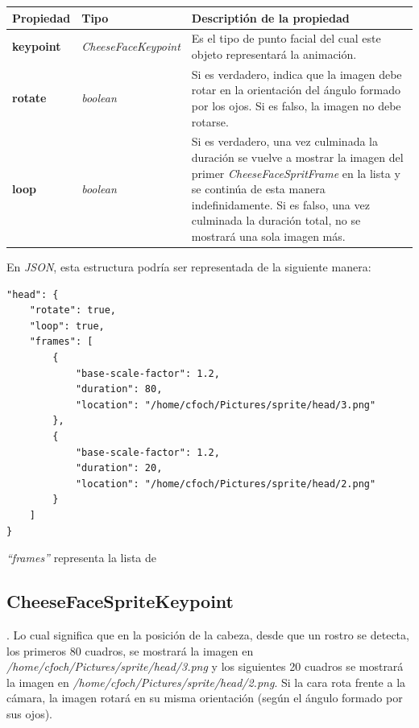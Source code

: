 \documentclass[a4paper,openright,12pt]{report}
\begin{document}
\begin{center}
  \begin{longtable}{| p{} | p{} | p{} |}
  \hline

  \textbf{Propiedad} &
  \textbf{Tipo} &
  \textbf{Descriptión de la propiedad}
  \\ \hline

  \textbf{keypoint} &
  \textit{CheeseFaceKeypoint} &
  Es el tipo de punto facial del cual este objeto representará la animación.
  \\ \hline

  \textbf{rotate} &
  \textit{boolean} &
  Si es verdadero, indica que la imagen debe rotar en la orientación del ángulo
  formado por los ojos. Si es falso, la imagen no debe rotarse.
  \\ \hline

  \textbf{loop} &
  \textit{boolean} &
  Si es verdadero, una vez culminada la duración se vuelve a mostrar la imagen
  del primer \textit{CheeseFaceSpritFrame} en la lista y se continúa de esta
  manera indefinidamente. Si es falso, una vez culminada la duración total, no
  se mostrará una sola imagen más.
  \\ \hline
  \end{longtable}
\end{center}

En \textit{JSON}, esta estructura podría ser representada de la siguiente
manera:\\

\begin{verbatim}
"head": {
    "rotate": true,
    "loop": true,
    "frames": [
        {
            "base-scale-factor": 1.2,
            "duration": 80,
            "location": "/home/cfoch/Pictures/sprite/head/3.png"
        },
        {
            "base-scale-factor": 1.2,
            "duration": 20,
            "location": "/home/cfoch/Pictures/sprite/head/2.png"
        }
    ]
}
\end{verbatim}

\textit{``frames''} representa la lista de
\subsection{CheeseFaceSpriteKeypoint}. Lo cual significa que en la posición de
la cabeza, desde que un rostro se detecta, los primeros 80 cuadros, se mostrará
la imagen en \textit{/home/cfoch/Pictures/sprite/head/3.png} y los siguientes 20
cuadros se mostrará la imagen en
\textit{/home/cfoch/Pictures/sprite/head/2.png}. Si la cara rota frente a la
cámara, la imagen rotará en su misma orientación (según el ángulo formado por 
sus ojos).
\end{document}
